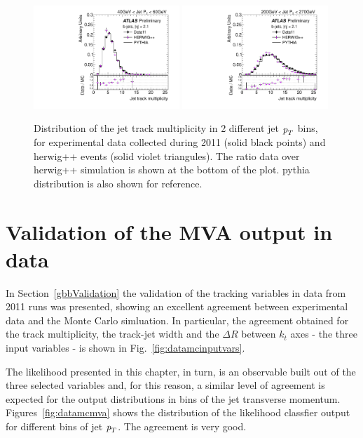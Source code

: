 \begin{figure}[tp]
\centering
\includegraphics[width=0.49\textwidth]{FIGS/systematics/DataVarNtrkPT040.pdf}
\includegraphics[width=0.49\textwidth]{FIGS/systematics/DataVarNtrkPT200.pdf}
\caption{Distribution of the jet track multiplicity in 2 different jet ${\emph{p}_{T}}$ bins, for experimental data  collected during 2011 (solid black points) and {\sc herwig}++ events (solid violet triangules). The ratio data over {\sc herwig}++ simulation is shown at the bottom of the plot. {\sc pythia} distribution is also shown for reference.}
\label{fig:herwigdatamc}
\end{figure}



\section{Validation of the MVA output in data}\label{sec:MVAvalidation}

In Section~\ref{gbbValidation} the validation of the tracking variables in data from 2011 runs was presented,  showing an excellent agreement between experimental data and the Monte Carlo simluation. In particular, the agreement obtained for the track multiplicity, the track-jet width and the $\Delta R$ between $k_t$ axes - the three input variables -  is shown in Fig.~\ref{fig:datamcinputvars}. 

The likelihood presented in this chapter, in turn, is an observable built out of the three selected variables and, for this reason, a similar level of agreement is expected for the output distributions in bins of the jet transverse momentum.  Figures~\ref{fig:datamcmva} shows the distribution of the likelihood classfier output for different bins of jet ${\emph{p}_{T}}$. The agreement is very good.


